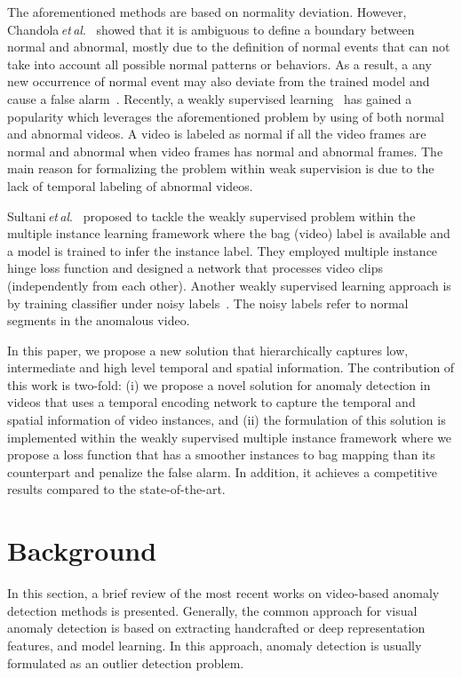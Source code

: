 \documentclass[journal]{IEEEtran}
\newcommand{\authorcite}{{\textit{et}\,\textit{al}.}}
\begin{document}
The aforementioned methods are based on normality deviation. However, Chandola\,\authorcite~\cite{chandola2009anomaly} showed that it is ambiguous to define a boundary between normal and abnormal, mostly due to the definition of normal events that can not take into account all possible normal patterns or behaviors. As a result, a any new occurrence of normal event may also deviate from the trained model and cause a false alarm~\cite{hasan2016learning}. Recently, a weakly supervised learning~\cite{sultani2018real,Zhong_2019_CVPR,zaheer2020claws} has gained a popularity which leverages the aforementioned problem by using of both normal and abnormal videos. A video is labeled as normal if all the video frames are normal and abnormal when video frames has normal and abnormal frames. The main reason for formalizing the problem within weak supervision is due to the lack of temporal labeling of abnormal videos.

Sultani\,\authorcite~\cite{sultani2018real} proposed to tackle the weakly supervised problem within the multiple instance learning framework where the bag (video) label is available and a model is trained to infer the instance label. They employed multiple instance hinge loss function and designed a network that processes video clips (independently from each other). Another weakly supervised learning approach is by training classifier under noisy labels~\cite{Zhong_2019_CVPR}. The noisy labels refer to normal segments in the anomalous video.

In this paper, we propose a new solution that hierarchically captures low, intermediate and high level temporal and spatial information. The contribution of this work is two-fold:
(i) we propose a novel solution for anomaly detection in videos that uses a temporal encoding network to capture the temporal and spatial information of video instances, and
(ii) the formulation of this solution is implemented within the weakly supervised multiple instance framework where we propose a loss function that has a smoother instances to bag mapping than its counterpart and penalize the false alarm. In addition, it achieves a competitive results compared to the state-of-the-art.

\section{Background}
In this section, a brief review of the most recent works on video-based anomaly detection methods is presented. Generally, the common approach for visual anomaly detection is based on extracting handcrafted or deep representation features, and model learning. In this approach, anomaly detection is usually formulated as an outlier detection problem.
\end{document}
